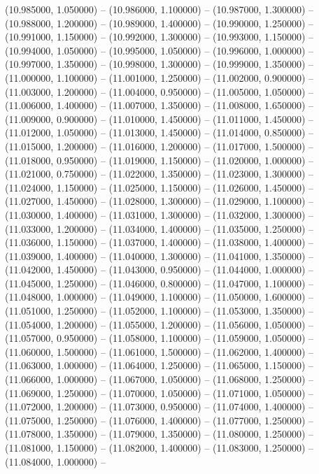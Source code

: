 (10.985000, 1.050000) -- 
(10.986000, 1.100000) -- 
(10.987000, 1.300000) -- 
(10.988000, 1.200000) -- 
(10.989000, 1.400000) -- 
(10.990000, 1.250000) -- 
(10.991000, 1.150000) -- 
(10.992000, 1.300000) -- 
(10.993000, 1.150000) -- 
(10.994000, 1.050000) -- 
(10.995000, 1.050000) -- 
(10.996000, 1.000000) -- 
(10.997000, 1.350000) -- 
(10.998000, 1.300000) -- 
(10.999000, 1.350000) -- 
(11.000000, 1.100000) -- 
(11.001000, 1.250000) -- 
(11.002000, 0.900000) -- 
(11.003000, 1.200000) -- 
(11.004000, 0.950000) -- 
(11.005000, 1.050000) -- 
(11.006000, 1.400000) -- 
(11.007000, 1.350000) -- 
(11.008000, 1.650000) -- 
(11.009000, 0.900000) -- 
(11.010000, 1.450000) -- 
(11.011000, 1.450000) -- 
(11.012000, 1.050000) -- 
(11.013000, 1.450000) -- 
(11.014000, 0.850000) -- 
(11.015000, 1.200000) -- 
(11.016000, 1.200000) -- 
(11.017000, 1.500000) -- 
(11.018000, 0.950000) -- 
(11.019000, 1.150000) -- 
(11.020000, 1.000000) -- 
(11.021000, 0.750000) -- 
(11.022000, 1.350000) -- 
(11.023000, 1.300000) -- 
(11.024000, 1.150000) -- 
(11.025000, 1.150000) -- 
(11.026000, 1.450000) -- 
(11.027000, 1.450000) -- 
(11.028000, 1.300000) -- 
(11.029000, 1.100000) -- 
(11.030000, 1.400000) -- 
(11.031000, 1.300000) -- 
(11.032000, 1.300000) -- 
(11.033000, 1.200000) -- 
(11.034000, 1.400000) -- 
(11.035000, 1.250000) -- 
(11.036000, 1.150000) -- 
(11.037000, 1.400000) -- 
(11.038000, 1.400000) -- 
(11.039000, 1.400000) -- 
(11.040000, 1.300000) -- 
(11.041000, 1.350000) -- 
(11.042000, 1.450000) -- 
(11.043000, 0.950000) -- 
(11.044000, 1.000000) -- 
(11.045000, 1.250000) -- 
(11.046000, 0.800000) -- 
(11.047000, 1.100000) -- 
(11.048000, 1.000000) -- 
(11.049000, 1.100000) -- 
(11.050000, 1.600000) -- 
(11.051000, 1.250000) -- 
(11.052000, 1.100000) -- 
(11.053000, 1.350000) -- 
(11.054000, 1.200000) -- 
(11.055000, 1.200000) -- 
(11.056000, 1.050000) -- 
(11.057000, 0.950000) -- 
(11.058000, 1.100000) -- 
(11.059000, 1.050000) -- 
(11.060000, 1.500000) -- 
(11.061000, 1.500000) -- 
(11.062000, 1.400000) -- 
(11.063000, 1.000000) -- 
(11.064000, 1.250000) -- 
(11.065000, 1.150000) -- 
(11.066000, 1.000000) -- 
(11.067000, 1.050000) -- 
(11.068000, 1.250000) -- 
(11.069000, 1.250000) -- 
(11.070000, 1.050000) -- 
(11.071000, 1.050000) -- 
(11.072000, 1.200000) -- 
(11.073000, 0.950000) -- 
(11.074000, 1.400000) -- 
(11.075000, 1.250000) -- 
(11.076000, 1.400000) -- 
(11.077000, 1.250000) -- 
(11.078000, 1.350000) -- 
(11.079000, 1.350000) -- 
(11.080000, 1.250000) -- 
(11.081000, 1.150000) -- 
(11.082000, 1.400000) -- 
(11.083000, 1.250000) -- 
(11.084000, 1.000000) -- 
